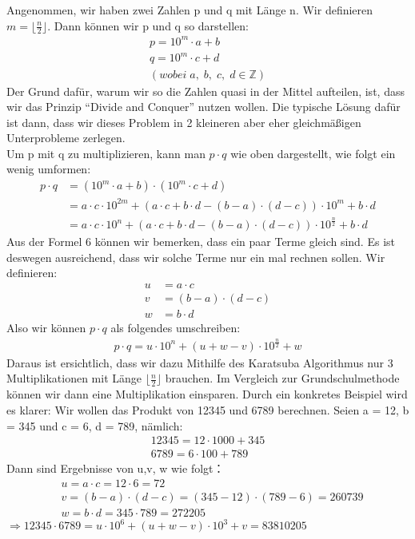 \documentclass[11pt,a4paper, twoside]{article}
\theoremstyle{definition}
\begin{document}
Angenommen, wir haben zwei Zahlen p und q mit Länge n. Wir definieren $m = \lfloor \frac{n}{2} \rfloor$. Dann können wir p und q so darstellen: 
\begin{align*}
p = 10^{m} \cdot a + b\\
q = 10^{m} \cdot c + d\\
(wobei \;a, \;b, \;c, \;d \in \mathbb{Z})
\end{align*}
Der Grund dafür, warum wir so die Zahlen quasi in der Mittel aufteilen, ist, dass wir das Prinzip “Divide and Conquer” nutzen wollen. Die typische Lösung dafür ist dann, dass wir dieses Problem in 2 kleineren aber eher gleichmäßigen Unterprobleme zerlegen.\\
Um p mit q zu multiplizieren, kann man $p \cdot q$ wie oben dargestellt, wie folgt ein wenig umformen: 
\begin{align}
p \cdot q &= (10^{m} \cdot a + b) \cdot (10^{m} \cdot c + d)\\
				 &= a\cdot c\cdot 10^{2m} + (a \cdot c + b \cdot d - (b - a) \cdot (d - c)) \cdot 10^{m} + b \cdot d\\
				 &= a\cdot c\cdot 10^{n} + (a \cdot c + b \cdot d - (b - a) \cdot (d - c)) \cdot 10^{\frac{n}{2}} + b \cdot d
\end{align}
Aus der Formel 6 können wir bemerken, dass ein paar Terme gleich sind. Es ist deswegen ausreichend, dass wir solche Terme nur ein mal rechnen sollen. Wir definieren: 
\begin{align*}
u &= a \cdot c\\
v &= (b - a) \cdot (d - c)\\
w &= b \cdot d
\end{align*}
Also wir können $p \cdot q$ als folgendes umschreiben: 
\begin{align*}
p \cdot q = u \cdot 10^{n} + (u + w - v) \cdot 10^{\frac{n}{2}} + w
\end{align*}
Daraus ist ersichtlich, dass wir dazu Mithilfe des Karatsuba Algorithmus nur 3 Multiplikationen mit Länge $\lfloor \frac{n}{2} \rfloor$ brauchen. Im Vergleich zur Grundschulmethode können wir dann eine Multiplikation einsparen.
Durch ein konkretes Beispiel wird es klarer: Wir wollen das Produkt von 12345 und 6789 berechnen. Seien a = 12, b = 345 und c = 6, d = 789, nämlich:
\begin{align*}
12345 = 12 \cdot 1000 + 345\\
6789 = 6 \cdot 100 + 789
\end{align*}
Dann sind Ergebnisse von u,v, w wie folgt：
\begin{align*}
&u = a \cdot c = 12 \cdot 6 = 72\\
&v = (b - a) \cdot (d - c) = (345 - 12) \cdot (789 - 6) = 260739\\
&w = b \cdot d = 345 \cdot 789 = 272205
\end{align*}
$\Rightarrow 12345 \cdot 6789 = u \cdot 10^{6} + (u + w - v) \cdot 10^{3} + v = 83810205$\\
\end{document}
